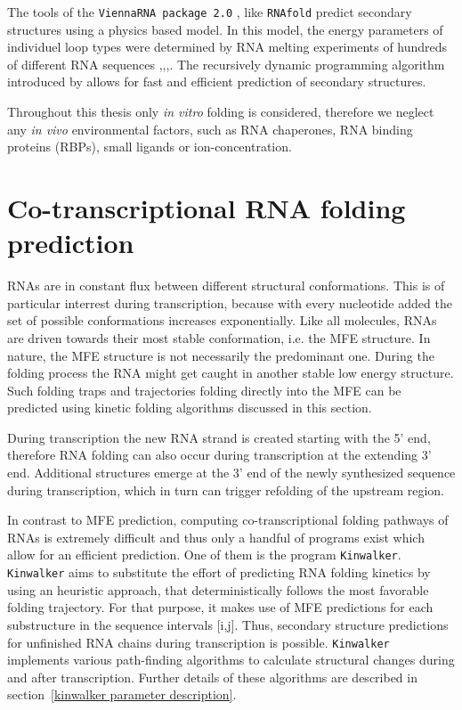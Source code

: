\documentclass[ twoside,openright,titlepage,numbers=noenddot,headinclude,%
                footinclude=false, cleardoublepage=empty,abstractoff, %
                BCOR=5mm,paper=a4,fontsize=11pt,%
                ngerman,american,%
                ]{scrreprt}
\begin{document}
The tools of the \texttt{ViennaRNA package 2.0} \cite{ViennaRNA}, like
\texttt{RNAfold}\cite{RNAfoldWebsite} predict secondary structures using a
physics based model. In this model, the energy parameters of individuel
loop types were determined by RNA melting experiments of hundreds of
different RNA sequences \cite{turner:1987},\cite{mathews:99},\cite{mathews:2002},\cite{turner:2009}.  The recursively
dynamic programming algorithm introduced by \citet{zuker:1981} allows for
fast and efficient prediction of secondary structures.


Throughout this thesis only {\it in vitro} folding is considered, therefore
we neglect any \emph{in vivo} environmental factors, such as RNA
chaperones, RNA binding proteins (RBPs), small ligands or
ion-concentration.

\section{Co-transcriptional RNA folding prediction}

RNAs are in constant flux between different structural conformations.
This is of particular interrest during transcription, because with every
nucleotide added the set of possible conformations increases
exponentially. Like all molecules, RNAs are driven towards their most stable
conformation, i.e. the MFE structure. 
In nature, the MFE structure is not necessarily the predominant one. During
the folding process the RNA might get caught in another stable low energy
structure. Such folding traps and trajectories folding directly into the MFE can be predicted using kinetic folding
algorithms discussed in this section.


During transcription the new RNA strand is created starting with the 5'
end, therefore RNA folding can also occur during transcription at the
extending 3' end\cite{Kramer1981}.
Additional structures emerge at the 3' end of the newly synthesized sequence during transcription, which in turn can trigger refolding of the upstream region.



In contrast to MFE prediction, computing co-transcriptional folding pathways of
RNAs is extremely difficult and thus only a handful of programs exist which
allow for an efficient prediction. One of them is the program
\texttt{Kinwalker\cite{kinwalker}}. \texttt{Kinwalker} aims to substitute
the effort of predicting RNA folding kinetics by using an heuristic approach, that
deterministically follows the most favorable folding trajectory. For that
purpose, it makes use of MFE predictions for each substructure in the
sequence intervals [i,j].
Thus, secondary structure predictions for unfinished RNA chains during transcription is possible.
\texttt{Kinwalker} implements various path-finding algorithms to calculate structural changes during and after transcription. Further details of these algorithms are described in section~\ref{kinwalker parameter description}.
\end{document}
